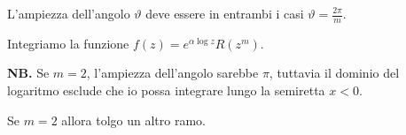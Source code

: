 L'ampiezza dell'angolo $\vartheta $ deve essere in entrambi i casi $\vartheta = \frac{2\pi }{m}$.



Integriamo la funzione $f(z) = e^{\alpha \log z} R\left(z^{m}\right)$.

\textbf{NB.} Se $m = 2$, l'ampiezza dell'angolo sarebbe $\pi $, tuttavia il dominio del logaritmo esclude che io possa integrare lungo la semiretta $x < 0$.

Se $m = 2$ allora tolgo un altro ramo.


\begin{figure}[htpb]
	\centering
{} %

\begin{tikzpicture}[x = 0.75pt,y = 0.75pt,yscale = -1,xscale = 1]


\end{tikzpicture}
\end{figure}
